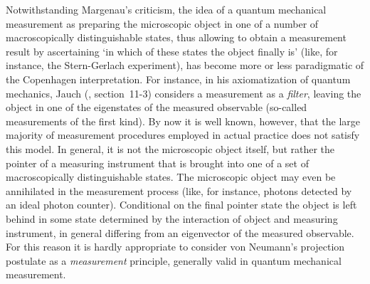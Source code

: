 \documentclass[12pt]{article}
\begin{document}
Notwithstanding Margenau's criticism, the idea of a quantum
mechanical measurement as preparing the microscopic object in one
of a number of macroscopically distinguishable states, thus
allowing to obtain a measurement result by ascertaining `in which
of these states the object finally is' (like, for instance, the
Stern-Gerlach experiment), has become more or less paradigmatic of
the Copenhagen interpretation. For instance, in his axiomatization
of quantum mechanics, Jauch (\cite{Jauch}, section~11-3) considers
a measurement as a {\em filter}, leaving the object in one of the
eigenstates of the measured observable (so-called measurements of
the first kind). By now it is well known, however, that the large
majority of measurement procedures employed in actual practice
does not satisfy this model. In general, it is not the microscopic
object itself, but rather the pointer of a measuring instrument
that is brought into one of a set of macroscopically
distinguishable states. The microscopic object may even be
annihilated in the measurement process (like, for instance,
photons detected by an ideal photon counter). Conditional on the
final pointer state the object is left behind in some state
determined by the interaction of object and measuring instrument,
in general differing from an eigenvector of the measured
observable. For this reason it is hardly appropriate to consider
von Neumann's projection postulate as a {\em measurement}
principle, generally valid in quantum mechanical measurement.
\end{document}
